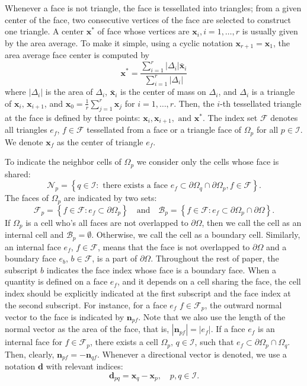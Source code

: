 \documentclass[../thesis.tex]{subfiles}
\begin{document}
Whenever a face is not triangle, the face is tessellated into triangles;
from a given center of the face, two consecutive vertices of the face
are selected to construct one triangle. A center \(\mathbf{x}^*\)
of face whose vertices are \(\mathbf{x}_i, i = 1 , \dots, r\) is
usually given by the area average. To make it simple, using a cyclic
notation \(\mathbf{x}_{r + 1} = \mathbf{x}_1 \), the area
average face center is computed by
\begin{equation}
	\mathbf{x}^* =
	\frac{\sum_{i=1}^r |\Delta_i| \bar{\mathbf{x}}_i}{\sum_{i=1}^{r} |\Delta_i|}
\end{equation}
where \(|\Delta_i|\) is the area of \(\Delta_i\), \(\bar{\mathbf{x}}_i\)
is the center of mass on \(\Delta_i\), and \(\Delta_i\) is a triangle of
\(\mathbf{x}_i,\, \mathbf{x}_{i+1}\), and
\(\mathbf{x}_0 = \frac{1}{r}\sum_{j=1}^r \mathbf{x}_j\)
for \(i = 1,\dots,r\). Then, the \(i\)-th tessellated triangle at
the face is defined by three points:
\(\mathbf{x}_i, \mathbf{x}_{i+1},\text{ and } \mathbf{x}^*\).
The index set \(\mathcal{F}\) denotes all
triangles \(e_f\), \(f \in \mathcal{F}\) tessellated from a face or a triangle
face of \(\Omega_p\) for all \(p \in \mathcal{I} \). We denote \(\mathbf{x}_f\)
as the center of triangle \(e_f\).

To indicate the neighbor cells of \(\Omega_p\) we consider only the cells
whose face is shared:
\[
	\mathcal{N}_p = \left\{
		q \in \mathcal{I}:\text{ there exists a face }
		e_f \subset \partial\Omega_q \cap \partial\Omega_p, f \in \mathcal{F}
	\right\}.
\]
The faces of \(\Omega_p\) are indicated by two sets:
\[
	\mathcal{F}_p = \left\{
		f \in \mathcal{F}: e_f \subset \partial \Omega_p
	\right\}\quad
	\text{and}\quad
	\mathcal{B}_p = \left\{
		f \in \mathcal{F}: e_f \subset \partial \Omega_p \cap \partial \Omega
	\right\}.
\]
If \(\Omega_p\) is a cell who's all faces are not overlapped to \(\partial \Omega\),
then we call the cell as an internal cell and \(\mathcal{B}_p = \emptyset\).
Otherwise, we call the cell as a boundary cell. Similarly, an internal face \(e_f\),
\(f \in \mathcal{F}\), means that the face is not overlapped to \(\partial\Omega\)
and a boundary face \(e_b\), \(b \in \mathcal{F}\), is a part of \(\partial \Omega\).
Throughout the rest of paper, the subscript \(b\) indicates the face index whose face
is a boundary face. When a quantity is defined on a face \(e_f\), and it depends on
a cell sharing the face, the cell index should be explicitly indicated at the first
subscript and the face index at the second subscript. For instance, for a face \(e_f \)
\(f \in \mathcal{F}_p\), the outward normal vector to the face is indicated by
\(\mathbf{n}_{pf}\). Note that we also use the length of the normal vector as the area of
the face, that is, \(|\mathbf{n}_{pf}| = |e_f|\). If a face \(e_f\) is an internal face
for \(f \in \mathcal{F}_p\), there exists a cell \(\Omega_p,\, q\in \mathcal{I}\),
such that \(e_f \subset \partial\Omega_p \cap \Omega_q\).
Then, clearly, \(\mathbf{n}_{pf} = -\mathbf{n}_{qf}\).
Whenever a directional vector is denoted, we use a notation \(\mathbf{d}\)
with relevant indices:
\[
	\mathbf{d}_{pq} = \mathbf{x}_q - \mathbf{x}_p,\quad
	p,q \in \mathcal{I}.
\]
\end{document}
